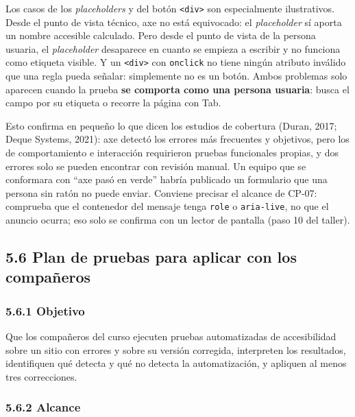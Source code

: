 \documentclass[10pt,letterpaper,onecolumn]{IEEEtran}
\begin{document}
Los casos de los \emph{placeholders} y del botón \texttt{<div>} son especialmente ilustrativos. Desde el punto de vista técnico, axe no está equivocado: el \emph{placeholder} sí aporta un nombre accesible calculado. Pero desde el punto de vista de la persona usuaria, el \emph{placeholder} desaparece en cuanto se empieza a escribir y no funciona como etiqueta visible. Y un \texttt{<div>} con \texttt{onclick} no tiene ningún atributo inválido que una regla pueda señalar: simplemente no es un botón. Ambos problemas solo aparecen cuando la prueba \textbf{se comporta como una persona usuaria}: busca el campo por su etiqueta o recorre la página con Tab.

Esto confirma en pequeño lo que dicen los estudios de cobertura (Duran, 2017; Deque Systems, 2021): axe detectó los errores más frecuentes y objetivos, pero los de comportamiento e interacción requirieron pruebas funcionales propias, y dos errores solo se pueden encontrar con revisión manual. Un equipo que se conformara con ``axe pasó en verde'' habría publicado un formulario que una persona sin ratón no puede enviar. Conviene precisar el alcance de CP-07: comprueba que el contenedor del mensaje tenga \texttt{role} o \texttt{aria-\allowbreak{}\allowbreak{}live}, no que el anuncio ocurra; eso solo se confirma con un lector de pantalla (paso 10 del taller).

\subsection{5.6 Plan de pruebas para aplicar con los compañeros}\label{plan-de-pruebas-para-aplicar-con-los-compauxf1eros}

\subsubsection{5.6.1 Objetivo}\label{objetivo}

Que los compañeros del curso ejecuten pruebas automatizadas de accesibilidad sobre un sitio con errores y sobre su versión corregida, interpreten los resultados, identifiquen qué detecta y qué no detecta la automatización, y apliquen al menos tres correcciones.

\subsubsection{5.6.2 Alcance}\label{alcance}
\end{document}
